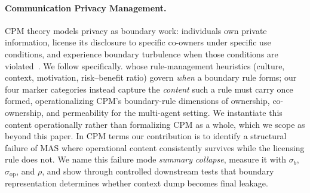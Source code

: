 \paragraph{Communication Privacy Management.}
CPM theory models privacy as boundary work: individuals own private information, license its disclosure to specific co-owners under specific use conditions, and experience boundary turbulence when those conditions are violated~\citep{petronio1991communication, petronio2002boundaries, griffin2006first}. 
We follow \citet{petronio2002boundaries} specifically. whose rule-management heuristics (culture, context, motivation, risk--benefit ratio) govern \emph{when} a boundary rule forms; our four marker categories instead capture the \emph{content} such a rule must carry once formed, operationalizing CPM's boundary-rule dimensions of ownership, co-ownership, and permeability for the multi-agent setting.
We instantiate this content operationally rather than formalizing CPM as a whole, which we scope as beyond this paper. 
In CPM terms our contribution is to identify a structural failure of MAS where operational content consistently survives while the licensing rule does not. We name this failure mode \emph{summary collapse}, measure it with $\sigma_b$, $\sigma_{\mathrm{op}}$, and $\rho$, and show through controlled downstream tests that boundary representation determines whether context dump becomes final leakage.
